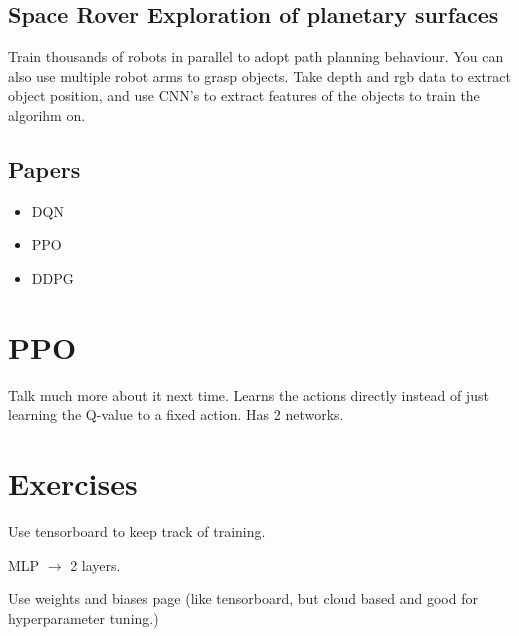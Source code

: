 \documentclass[a4paper]{article}
\begin{document}
\subsection{Space Rover Exploration of planetary surfaces}
Train thousands of robots in parallel to adopt path planning behaviour. You can also use multiple robot arms to grasp objects. Take depth and rgb data to extract object position, and use CNN's to extract features of the objects to train the algorihm on. 


\subsection{Papers}
\begin{itemize}
	\item DQN
	\item PPO
	\item DDPG
\end{itemize}


\section{PPO}
Talk much more about it next time.
Learns the actions directly instead of just learning the Q-value to a fixed action. Has 2 networks. 

\section{Exercises}
Use tensorboard to keep track of training. 

MLP $ \rightarrow $ 2 layers.

Use weights and biases page (like tensorboard, but cloud based and good for hyperparameter tuning.)
\end{document}
